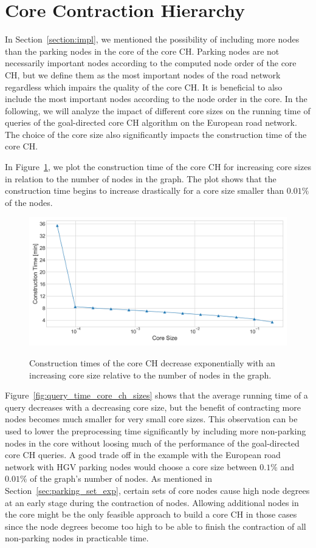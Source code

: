 \section{Core Contraction Hierarchy}
In Section~\ref{section:impl}, we mentioned the possibility of including more nodes than the parking nodes in the core of the core CH. Parking nodes are not necessarily important nodes according to the computed node order of the core CH, but we define them as the most important nodes of the road network regardless which impairs the quality of the core CH. It is beneficial to also include the most important nodes according to the node order in the core. In the following, we will analyze the impact of different core sizes on the running time of queries of the goal-directed core CH algorithm on the European road network. The choice of the core size also significantly impacts the construction time of the core CH.

In Figure~\ref{fig:preprocessing_time_core_ch}, we plot the construction time of the core CH for increasing core sizes in relation to the number of nodes in the graph. The plot shows that the construction time begins to increase drastically for a core size smaller than $0.01\%$ of the nodes.

\begin{figure}[hbtp]
	\centering
	\includegraphics[width=.95\textwidth]{plots/thesis_core_sizes-csp-parking_europe_hgv-constr_time.png}
	\label{fig:preprocessing_time_core_ch}
	\caption{Construction times of the core CH decrease exponentially with an increasing core size relative to the number of nodes in the graph.}
\end{figure}

Figure~\ref{fig:query_time_core_ch_sizes} shows that the average running time of a query decreases with a decreasing core size, but the benefit of contracting more nodes becomes much smaller for very small core sizes. This observation can be used to lower the preprocessing time significantly by including more non-parking nodes in the core without loosing much of the performance of the goal-directed core CH queries. A good trade off in the example with the European road network with HGV parking nodes would choose a core size between $0.1\%$ and $0.01\%$ of the graph's number of nodes. As mentioned in Section~\ref{sec:parking_set_exp}, certain sets of core nodes cause high node degrees at an early stage during the contraction of nodes. Allowing additional nodes in the core might be the only feasible approach to build a core CH in those cases since the node degrees become too high to be able to finish the contraction of all non-parking nodes in practicable time.


